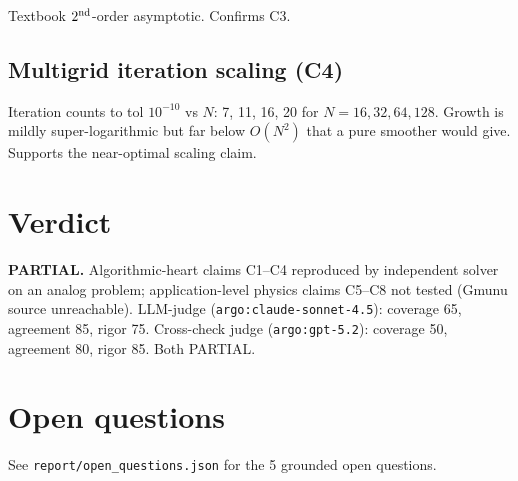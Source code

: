 \documentclass[11pt]{article}
\begin{document}
Textbook $2^{\rm nd}$-order asymptotic. Confirms C3.

\subsection{Multigrid iteration scaling (C4)}

Iteration counts to tol $10^{-10}$ vs $N$: 7, 11, 16, 20 for $N = 16, 32, 64, 128$. Growth is mildly super-logarithmic but far below $O(N^2)$ that a pure smoother would give. Supports the near-optimal scaling claim.

\section{Verdict}
\textbf{PARTIAL.} Algorithmic-heart claims C1--C4 reproduced by independent solver on an analog problem; application-level physics claims C5--C8 not tested (Gmunu source unreachable). LLM-judge (\texttt{argo:claude-sonnet-4.5}): coverage 65, agreement 85, rigor 75. Cross-check judge (\texttt{argo:gpt-5.2}): coverage 50, agreement 80, rigor 85. Both PARTIAL.

\section{Open questions}
See \texttt{report/open\_questions.json} for the 5 grounded open questions.
\end{document}
